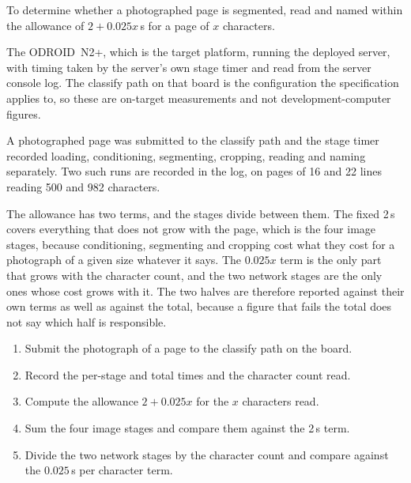         To determine whether a photographed page is segmented, read and named
        within the allowance of $2+0.025x$\,s for a page of $x$ characters.

        \medskip

        The ODROID~N2+, which is the target platform, running the deployed
        server, with timing taken by the server's own stage timer and read from
        the server console log. The classify path on that board is the
        configuration the specification applies to, so these are on-target
        measurements and not development-computer figures.

        \medskip

        A photographed page was submitted to the classify path and the stage
        timer recorded loading, conditioning, segmenting, cropping, reading and
        naming separately. Two such runs are recorded in the log, on pages of 16
        and 22 lines reading 500 and 982 characters.

        The allowance has two terms, and the stages divide between them. The
        fixed 2\,s covers everything that does not grow with the page, which is
        the four image stages, because conditioning, segmenting and cropping
        cost what they cost for a photograph of a given size whatever it says.
        The $0.025x$ term is the only part that grows with the character count,
        and the two network stages are the only ones whose cost grows with it.
        The two halves are therefore reported against their own terms as well as
        against the total, because a figure that fails the total does not say
        which half is responsible.

        \medskip

        \begin{enumerate}
        \item Submit the photograph of a page to the classify path on the board.
        \item Record the per-stage and total times and the character count read.
        \item Compute the allowance $2+0.025x$ for the $x$ characters read.
        \item Sum the four image stages and compare them against the 2\,s term.
        \item Divide the two network stages by the character count and compare
              against the $0.025\,$s per character term.
        \end{enumerate}

